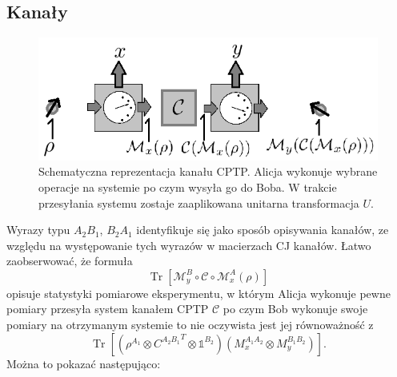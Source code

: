 \documentclass[10pt]{article} %
\DeclareMathOperator{\Trs}{Tr}
\newcommand{\I}{\mathbb{1}}
\begin{document}
\subsection{Kanały}
\begin{figure}[h]
\centering
\includegraphics{obrazki/channel_new}
\caption{Schematyczna reprezentacja kanału CPTP. Alicja wykonuje wybrane operacje na systemie po czym wysyła go do Boba. W trakcie przesyłania systemu zostaje zaaplikowana unitarna transformacja $U$.}
\end{figure}
Wyrazy typu $A_2B_1$, $B_2A_1$ identyfikuje się jako sposób opisywania kanałów, ze względu na występowanie tych wyrazów w macierzach CJ kanałów.
Łatwo zaobserwować, że formuła
\begin{equation}
\Trs \left[ \mathcal{M}_y^B \circ \mathcal{C} \circ \mathcal{M}_x^A(\rho)\right]
\end{equation} opisuje statystyki pomiarowe eksperymentu, w którym Alicja wykonuje pewne pomiary przesyła system kanałem CPTP $\mathcal{C}$ po czym Bob wykonuje swoje pomiary na otrzymanym systemie to nie oczywista jest jej równoważność z 
\begin{equation}
\Trs \left[\left( \rho^{A_1}\otimes  {C^{A_2B_1}}^T \otimes \I^{B_2}\right)(M_x^{A_1A_2}\otimes M_y^{B_1B_2})\right].
\end{equation} Można to pokazać następująco: 
\end{document}
